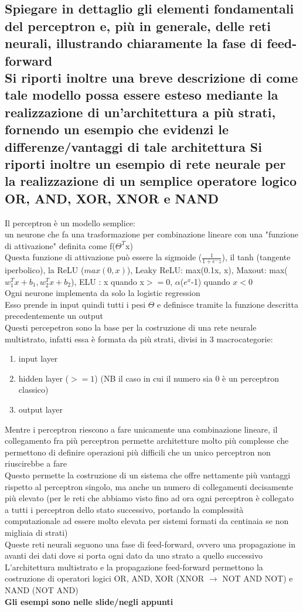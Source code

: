 \documentclass[10pt,oneside,a4paper]{article}
\begin{document}
	
	
	\subsection{Spiegare in dettaglio gli elementi fondamentali del perceptron e, più in generale, delle reti
		neurali, illustrando chiaramente la fase di feed-forward\\
		Si riporti inoltre una breve descrizione di come tale modello possa essere esteso
		mediante la realizzazione di un’architettura a più strati, fornendo un esempio che evidenzi
		le differenze/vantaggi di tale architettura
		Si riporti inoltre un esempio di rete neurale per la realizzazione di un semplice operatore
		logico OR, AND, XOR, XNOR e NAND}
	Il perceptron è un modello semplice:\\
	un neurone che fa una trasformazione per combinazione lineare con una "funzione di attivazione" definita come f($\Theta^T$x)\\
	Questa funzione di attivazione può essere la sigmoide ($\frac{1}{1+e^-z}$), il tanh (tangente iperbolico), la ReLU ($max(0,x)$), Leaky ReLU: max(0.1x, x), Maxout: max($w_1^Tx+b_1, w_2^Tx+b_2$), ELU : x quando x$>=0$, $\alpha$($e^x$-1) quando $x<0$\\
	Ogni neurone implementa da solo la logistic regression\\
	Esso prende in input quindi tutti i pesi $\Theta$ e definisce tramite la funzione descritta precedentemente un output\\
	Questi percepetron sono la base per la costruzione di una rete neurale multistrato, infatti essa è formata da più strati, divisi in 3 macrocategorie:
	\begin{enumerate}
		\item input layer
		\item hidden layer ($>=1$) (NB il caso in cui il numero sia 0 è un perceptron classico)
		\item output layer
	\end{enumerate}
	Mentre i perceptron riescono a fare unicamente una combinazione lineare, il collegamento fra più perceptron permette architetture molto più complesse che permettono di definire operazioni più difficili che un unico perceptron non riuscirebbe a fare\\
	Questo permette la costruzione di un sistema che offre nettamente più vantaggi rispetto al perceptron singolo, ma anche un numero di collegamenti decisamente più elevato (per le reti che abbiamo visto fino ad ora ogni perceptron è collegato a tutti i perceptron dello stato successivo, portando la complessità computazionale ad essere molto elevata per sistemi formati da centinaia se non migliaia di strati)\\
	Queste reti neurali seguono una fase di feed-forward, ovvero una propagazione in avanti dei dati dove si porta ogni dato da uno strato a quello successivo\\
	L'architettura multistrato e la propagazione feed-forward permettono la costruzione di operatori logici OR, AND, XOR (XNOR $\to$ NOT AND NOT) e NAND (NOT AND)\\
	\textbf{Gli esempi sono nelle slide/negli appunti}	
		
\end{document}
